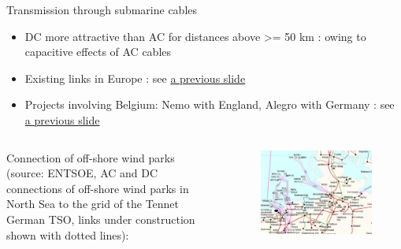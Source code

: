 \begin{frame}
{Transmission through submarine cables}
\begin{itemize}
\item DC more attractive than AC for distances above >= 50 km : owing to capacitive effects of AC cables
\item Existing links in Europe : see \href{https://www.elia.be/fr/donnees-de-reseau/transport/flux-physiques-sur-le-reseau-haute-tension-belge}{a previous slide}
\item Projects involving Belgium: Nemo with England, Alegro with Germany : see \href{https://www.elia.be/fr/donnees-de-reseau/transport/flux-physiques-sur-le-reseau-haute-tension-belge}{a previous slide}
\end{itemize}
\begin{columns}
Connection of off-shore wind parks (source: ENTSOE, AC and DC connections of off-shore wind parks in North Sea to the grid of the Tennet German TSO, links under construction shown with dotted lines):
\begin{figure}
\centering
\includegraphics[width=\linewidth]{images/DC_cable.png}
\end{figure}
\end{columns}
\end{frame}

